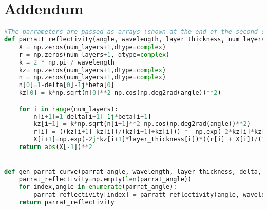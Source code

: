 \section*{Addendum}
\begin{lstlisting}[language=python, caption=parrat\_algorithm]
#The parrameters are passed as arrays (shown at the end of the second code listing). The first index denotes the substrate layer and the last index the vacuum layer.
def parratt_reflectivity(angle, wavelength, layer_thickness, num_layers,delta,beta,sigma):
    X = np.zeros(num_layers+1,dtype=complex)
    r = np.zeros(num_layers+1, dtype=complex)
    k = 2 * np.pi / wavelength
    kz= np.zeros(num_layers+1,dtype=complex)
    n = np.zeros(num_layers+1,dtype=complex)
    n[0]=1-delta[0]-1j*beta[0]
    kz[0] = k*np.sqrt(n[0]**2-np.cos(np.deg2rad(angle))**2)

    for i in range(num_layers):
        n[i+1]=1-delta[i+1]-1j*beta[i+1]     
        kz[i+1] = k*np.sqrt(n[i+1]**2-np.cos(np.deg2rad(angle))**2)
        r[i] = ((kz[i+1]-kz[i])/(kz[i+1]+kz[i])) *  np.exp(-2*kz[i]*kz[i+1]*sigma[i]**2)
        X[i+1]=np.exp(-2j*kz[i+1]*layer_thickness[i])*((r[i] + X[i])/(1+r[i]*X[i] ))       
    return abs(X[-1])**2


def gen_parrat_curve(parrat_angle, wavelength, layer_thickness, delta, beta, sigma):
    parrat_reflectivity=np.empty(len(parrat_angle))
    for index,angle in enumerate(parrat_angle):
        parrat_reflectivity[index] = parratt_reflectivity(angle, wavelength, layer_thickness, len(layer_thickness),delta,beta,sigma)
    return parrat_reflectivity

\end{lstlisting}


